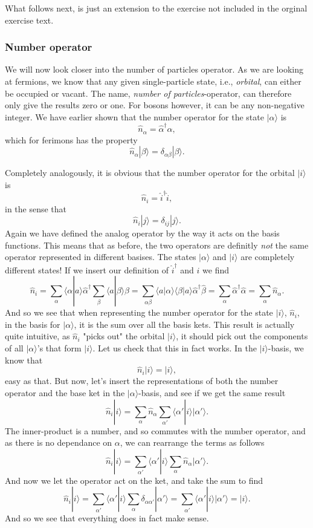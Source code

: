 \documentclass[a4paper, 11pt, notitlepage, english]{article}
\newcommand{\ket}[1]{|#1 \rangle}
\newcommand{\braket}[2]{\langle #1 | #2 \rangle}
\newcommand{\op}[1]{\hat{#1}}
\begin{document}
What follows next, is just an extension to the exercise not included in the orginal exercise text.

\subsubsection*{Number operator}
We will now look closer into the number of particles operator. As we are looking at fermions, we know that any given single-particle state, i.e., \emph{orbital}, can either be occupied or vacant. The name, \emph{number of particles}-operator, can therefore only give the results zero or one. For bosons however, it can be any non-negative integer. We have earlier shown that the number operator for the state $\ket{\alpha}$ is
$$\op{n}_\alpha = \op{\alpha}^\dag \op{\alpha},$$
which for ferimons has the property
$$\op{n}_\alpha \ket{\beta} = \delta_{\alpha\beta}\ket{\beta}.$$

Completely analogously, it is obvious that the number operator for the orbital $\ket{i}$ is
$$\op{n}_i = \op{i}^\dag \op{i},$$
in the sense that
$$\op{n}_i \ket{j} = \delta_{ij}\ket{j}.$$
Again we have defined the analog operator by the way it acts on the basis functions. This means that as before, the two operators are definitly \emph{not} the same operator represented in different basises. The states $\ket{\alpha}$ and $\ket{i}$ are completely different states! If we insert our definition of $\op{i}^\dag$ and $\op{i}$ we find
$$\op{n}_i = \sum_{\alpha}\braket{\alpha}{a}\op{\alpha}^\dag \sum_{\beta} \braket{a}{\beta}\op{\beta} = \sum_{\alpha\beta} \braket{a}{\alpha}\braket{\beta}{a} \op{\alpha}^\dag \op{\beta} = \sum_\alpha \op{\alpha}^\dag \op{\alpha} = \sum_\alpha \op{n}_\alpha.$$
And so we see that when representing the number operator for the state $\ket{i}$, $\op{n}_i$, in the basis for $\ket{\alpha}$, it is the sum over all the basis kets. This result is actually quite intuitive, as $\op{n}_i$ "picks out" the orbital $\ket{i}$, it should pick out the components of all $\ket{\alpha}$'s that form $\ket{i}$. Let us check that this in fact works. In the $\ket{i}$-basis, we know that
$$\op{n}_i \ket{i} = \ket{i},$$
easy as that. But now, let's insert the representations of both the number operator and the base ket in the $\ket{\alpha}$-basis, and see if we get the same result
$$\op{n}_i \ket{i} = \sum_{\alpha}\op{n}_\alpha \sum_{\alpha'}\braket{\alpha'}{i}\ket{\alpha'}.$$
The inner-product is a number, and so commutes with the number operator, and as there is no dependance on $\alpha$, we can rearrange the terms as follows
$$\op{n}_i \ket{i} =  \sum_{\alpha'}\braket{\alpha'}{i} \sum_{\alpha}\op{n}_\alpha\ket{\alpha'}.$$
And now we let the operator act on the ket, and take the sum to find 
$$\op{n}_i \ket{i} = \sum_{\alpha'}\braket{\alpha'}{i} \sum_{\alpha} \delta_{\alpha \alpha'}\ket{\alpha'} = \sum_{\alpha'} \braket{\alpha'}{i}\ket{\alpha'} = \ket{i}.$$
And so we see that everything does in fact make sense.
\end{document}
